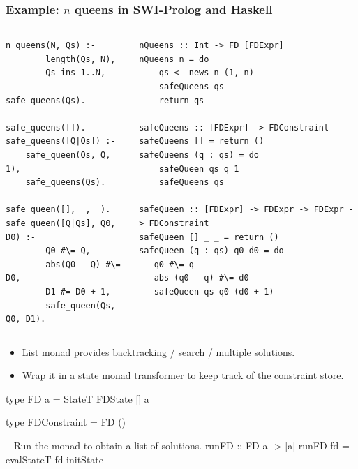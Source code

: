 \documentclass[aspectratio=169,hyphens]{beamer} %
\begin{document}
\begin{frame}[fragile]
    \frametitle{Example: $n$ queens in SWI-Prolog and Haskell}

\begin{columns}[t]
\column[t]{0.33\paperwidth}
\begin{verbatim}
n_queens(N, Qs) :-
        length(Qs, N),
        Qs ins 1..N,
        safe_queens(Qs).

safe_queens([]).
safe_queens([Q|Qs]) :-
    safe_queen(Qs, Q, 1),
    safe_queens(Qs).

safe_queen([], _, _).
safe_queen([Q|Qs], Q0, D0) :-
        Q0 #\= Q,
        abs(Q0 - Q) #\= D0,
        D1 #= D0 + 1,
        safe_queen(Qs, Q0, D1).
\end{verbatim}
\pause
\column[t]{0.59\paperwidth}
\begin{verbatim}
nQueens :: Int -> FD [FDExpr]
nQueens n = do
    qs <- news n (1, n)
    safeQueens qs
    return qs

safeQueens :: [FDExpr] -> FDConstraint
safeQueens [] = return ()
safeQueens (q : qs) = do
    safeQueen qs q 1
    safeQueens qs

safeQueen :: [FDExpr] -> FDExpr -> FDExpr -> FDConstraint
safeQueen [] _ _ = return ()
safeQueen (q : qs) q0 d0 = do
   q0 #\= q 
   abs (q0 - q) #\= d0
   safeQueen qs q0 (d0 + 1)
\end{verbatim}
\end{columns}
\end{frame}
\begin{frame}[fragile]
\begin{itemize}
    \item List monad provides backtracking / search / multiple solutions.
        \pause
    \item Wrap it in a state monad transformer to keep track of the constraint store.
        \pause
\end{itemize}
\begin{code}
type FD a = StateT FDState [] a
\end{code}
\pause
\begin{code}
type FDConstraint = FD ()
\end{code}
\pause
\begin{code}
-- Run the monad to obtain a list of solutions.
runFD :: FD a -> [a]
runFD fd = evalStateT fd initState
\end{code}
\end{frame}
\end{document}
